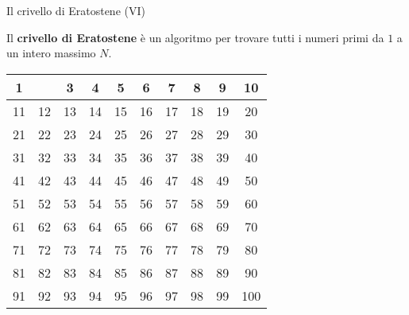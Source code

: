 \begin{frame}{Il crivello di Eratostene (VI)}

  Il \textbf{crivello di Eratostene} è un algoritmo per trovare
  tutti i numeri primi da $1$ a un intero massimo $N$.

  \begin{table}[]
  \centering
    \begin{tabular}{|c|c|c|c|c|c|c|c|c|c|}
    \hline
    \cellcolor[HTML]{C0C0C0}1  & \cellcolor[HTML]{FCFF2F}{\color[HTML]{FE0000} 2} & 3  & \cellcolor[HTML]{FFCCC9}4 & 5  & \cellcolor[HTML]{FFCCC9}6 & 7  & 8  & 9  & 10  \\ \hline
    11 & 12                        & 13 & 14                        & 15 & 16                        & 17 & 18 & 19 & 20  \\ \hline
    21 & 22                        & 23 & 24                        & 25 & 26                        & 27 & 28 & 29 & 30  \\ \hline
    31 & 32                        & 33 & 34                        & 35 & 36                        & 37 & 38 & 39 & 40  \\ \hline
    41 & 42                        & 43 & 44                        & 45 & 46                        & 47 & 48 & 49 & 50  \\ \hline
    51 & 52                        & 53 & 54                        & 55 & 56                        & 57 & 58 & 59 & 60  \\ \hline
    61 & 62                        & 63 & 64                        & 65 & 66                        & 67 & 68 & 69 & 70  \\ \hline
    71 & 72                        & 73 & 74                        & 75 & 76                        & 77 & 78 & 79 & 80  \\ \hline
    81 & 82                        & 83 & 84                        & 85 & 86                        & 87 & 88 & 89 & 90  \\ \hline
    91 & 92                        & 93 & 94                        & 95 & 96                        & 97 & 98 & 99 & 100 \\ \hline
    \end{tabular}
  \end{table}

\end{frame}

